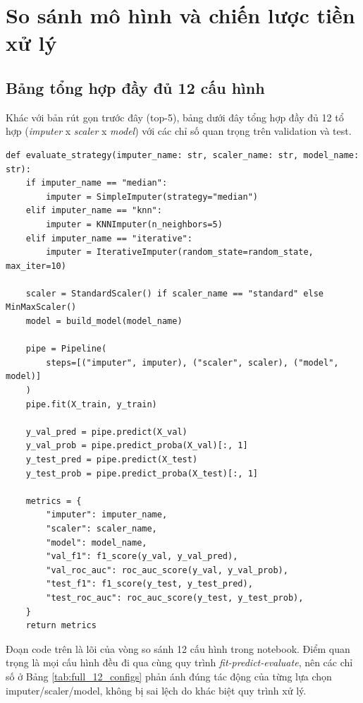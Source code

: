 \section{So sánh mô hình và chiến lược tiền xử lý}
\subsection{Bảng tổng hợp đầy đủ 12 cấu hình}
Khác với bản rút gọn trước đây (top-5), bảng dưới đây tổng hợp đầy đủ 12 tổ hợp
(\textit{imputer} x \textit{scaler} x \textit{model}) với các chỉ số quan trọng trên validation và test.

\begin{lstlisting}[caption={Hàm đánh giá một chiến lược imputer + scaler + model}]
def evaluate_strategy(imputer_name: str, scaler_name: str, model_name: str):
    if imputer_name == "median":
        imputer = SimpleImputer(strategy="median")
    elif imputer_name == "knn":
        imputer = KNNImputer(n_neighbors=5)
    elif imputer_name == "iterative":
        imputer = IterativeImputer(random_state=random_state, max_iter=10)

    scaler = StandardScaler() if scaler_name == "standard" else MinMaxScaler()
    model = build_model(model_name)

    pipe = Pipeline(
        steps=[("imputer", imputer), ("scaler", scaler), ("model", model)]
    )
    pipe.fit(X_train, y_train)

    y_val_pred = pipe.predict(X_val)
    y_val_prob = pipe.predict_proba(X_val)[:, 1]
    y_test_pred = pipe.predict(X_test)
    y_test_prob = pipe.predict_proba(X_test)[:, 1]

    metrics = {
        "imputer": imputer_name,
        "scaler": scaler_name,
        "model": model_name,
        "val_f1": f1_score(y_val, y_val_pred),
        "val_roc_auc": roc_auc_score(y_val, y_val_prob),
        "test_f1": f1_score(y_test, y_test_pred),
        "test_roc_auc": roc_auc_score(y_test, y_test_prob),
    }
    return metrics
\end{lstlisting}

\noindent
Đoạn code trên là lõi của vòng so sánh 12 cấu hình trong notebook. Điểm quan trọng là mọi cấu hình đều đi qua cùng quy trình
\textit{fit-predict-evaluate}, nên các chỉ số ở Bảng \ref{tab:full_12_configs} phản ánh đúng tác động của từng lựa chọn
imputer/scaler/model, không bị sai lệch do khác biệt quy trình xử lý.

